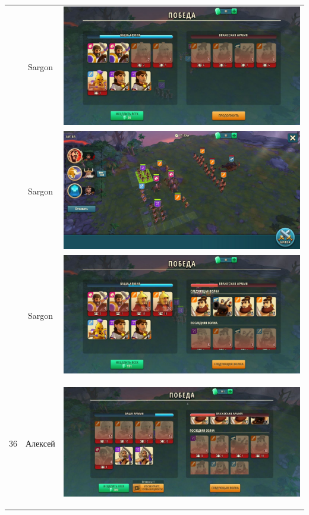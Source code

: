 \begin{longtable}{|c|c|c|}
	& Sargon &
	\includegraphics[width=0.75\linewidth]{./parts/media/TreasureHunt/36/sargon/photo_2022-04-07_13-16-46.jpg} \\
	& Sargon &
	\includegraphics[width=0.75\linewidth]{./parts/media/TreasureHunt/36/sargon/photo_2022-04-07_13-16-43.jpg} \\
	& Sargon &
	\includegraphics[width=0.75\linewidth]{./parts/media/TreasureHunt/36/sargon/photo_2022-04-07_13-16-40.jpg} \\
	\hline
	\multirow{12}{*}{36} & Алексей &
	\hypertarget{fight36}{\includegraphics[width=0.75\linewidth]{./parts/media/TreasureHunt/36/alexey/photo_2022-04-15_11-02-44.jpg}} \\

\end{longtable}

